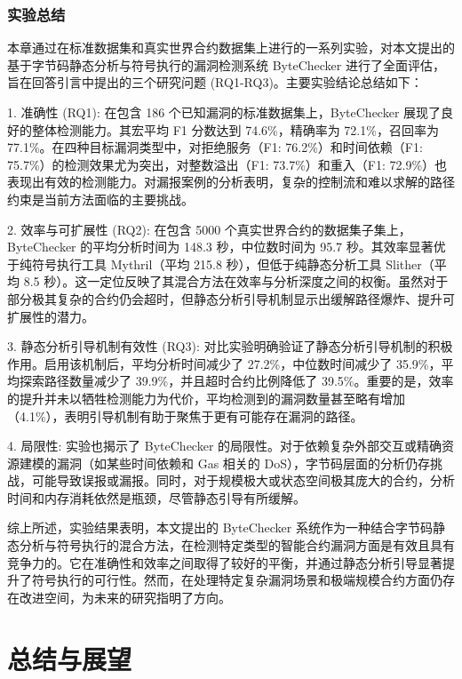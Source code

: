 \documentclass[print, master, vlined, timesmath]{DissertUESTC}
\begin{document}
\subsection{实验总结}


本章通过在标准数据集和真实世界合约数据集上进行的一系列实验，对本文提出的基于字节码静态分析与符号执行的漏洞检测系统 ByteChecker 进行了全面评估，旨在回答引言中提出的三个研究问题 (RQ1-RQ3)。主要实验结论总结如下：

1.  准确性 (RQ1): 在包含 186 个已知漏洞的标准数据集上，ByteChecker 展现了良好的整体检测能力。其宏平均 F1 分数达到 74.6\%，精确率为 72.1\%，召回率为 77.1\%。在四种目标漏洞类型中，对拒绝服务（F1: 76.2\%）和时间依赖（F1: 75.7\%）的检测效果尤为突出，对整数溢出（F1: 73.7\%）和重入（F1: 72.9\%）也表现出有效的检测能力。对漏报案例的分析表明，复杂的控制流和难以求解的路径约束是当前方法面临的主要挑战。

2.  效率与可扩展性 (RQ2): 在包含 5000 个真实世界合约的数据集子集上，ByteChecker 的平均分析时间为 148.3 秒，中位数时间为 95.7 秒。其效率显著优于纯符号执行工具 Mythril（平均 215.8 秒），但低于纯静态分析工具 Slither（平均 8.5 秒）。这一定位反映了其混合方法在效率与分析深度之间的权衡。虽然对于部分极其复杂的合约仍会超时，但静态分析引导机制显示出缓解路径爆炸、提升可扩展性的潜力。

3.  静态分析引导机制有效性 (RQ3): 对比实验明确验证了静态分析引导机制的积极作用。启用该机制后，平均分析时间减少了 27.2\%，中位数时间减少了 35.9\%，平均探索路径数量减少了 39.9\%，并且超时合约比例降低了 39.5\%。重要的是，效率的提升并未以牺牲检测能力为代价，平均检测到的漏洞数量甚至略有增加（4.1\%），表明引导机制有助于聚焦于更有可能存在漏洞的路径。

4.  局限性: 实验也揭示了 ByteChecker 的局限性。对于依赖复杂外部交互或精确资源建模的漏洞（如某些时间依赖和 Gas 相关的 DoS），字节码层面的分析仍存挑战，可能导致误报或漏报。同时，对于规模极大或状态空间极其庞大的合约，分析时间和内存消耗依然是瓶颈，尽管静态引导有所缓解。

综上所述，实验结果表明，本文提出的 ByteChecker 系统作为一种结合字节码静态分析与符号执行的混合方法，在检测特定类型的智能合约漏洞方面是有效且具有竞争力的。它在准确性和效率之间取得了较好的平衡，并通过静态分析引导显著提升了符号执行的可行性。然而，在处理特定复杂漏洞场景和极端规模合约方面仍存在改进空间，为未来的研究指明了方向。

\chapter{总结与展望}
\end{document}
